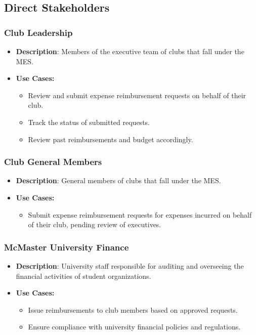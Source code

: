 \documentclass[12pt]{article}
\begin{document}
  \subsection{Direct Stakeholders}
    \subsubsection{Club Leadership}
      \begin{itemize}
        \item \textbf{Description}: Members of the executive team of clubs that fall under the MES.  
        \item \textbf{Use Cases:}
          \begin{itemize}
            \item Review and submit expense reimbursement requests on behalf of their club.
            \item Track the status of submitted requests.
            \item Review past reimbursements and budget accordingly.
          \end{itemize}
      \end{itemize}
    \subsubsection{Club General Members}
      \begin{itemize}
        \item \textbf{Description}: General members of clubs that fall under the MES.
        \item \textbf{Use Cases:}
          \begin{itemize}
            \item Submit expense reimbursement requests for expenses incurred on behalf of their club, pending review of executives.
          \end{itemize}
      \end{itemize}
    \subsubsection{McMaster University Finance}
      \begin{itemize}
        \item \textbf{Description}: University staff responsible for auditing and overseeing the financial activities of student organizations.
        \item \textbf{Use Cases:}
          \begin{itemize}
            \item Issue reimbursements to club members based on approved requests.
            \item Ensure compliance with university financial policies and regulations.
          \end{itemize}
      \end{itemize}
\end{document}
